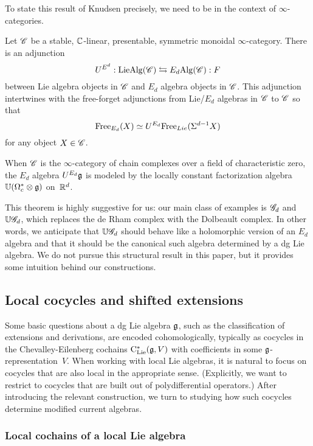 To state this result of Knudsen precisely, we need to be in the context of $\infty$-categories.

\begin{thm} 
\label{thm:knudsen}
Let $\mathscr C$ be a stable, $\mathbb C$-linear, presentable, symmetric monoidal $\infty$-category.
There is an adjunction
\[
U^{E^d} : {\rm LieAlg}(\mathscr C) \leftrightarrows E_d{\rm Alg} (\mathscr C): F
\]
between Lie algebra objects in $\mathscr C$ and $E_d$ algebra objects in $\mathscr C$.
This adjunction intertwines with the free-forget adjunctions from Lie/$E_d$ algebras in $\mathscr C$ to $\mathscr C$ 
so that 
\[
{\rm Free}_{E_d}(X) \simeq U^{E_d} {\rm Free}_{Lie}(\Sigma^{d-1} X)
\]
for any object $X \in \mathscr C$. 

When $\mathscr C$ is the $\infty$-category of chain complexes over a field of characteristic zero,
the $E_d$ algebra $U^{E_d} \mathfrak g$ is modeled by the locally constant factorization algebra $\mathbb U(\Omega^*_c \otimes \mathfrak g)$ on~$\mathbb R^d$.
\end{thm}

This theorem is highly suggestive for us:
our main class of examples is $\mathscr G_d$ and $\mathbb U \mathscr G_d$,
which replaces the de Rham complex with the Dolbeault complex.
In other words, we anticipate that $\mathbb U \mathscr G_d$ should behave like a holomorphic version of an $E_d$ algebra
and that it should be the canonical such algebra determined by a dg Lie algebra.
We do not pursue this structural result in this paper,
but it provides some intuition behind our constructions.

\subsection{Local cocycles and shifted extensions}
\label{sec: localcocycle}

Some basic questions about a dg Lie algebra $\mathfrak g$, such as the classification of extensions and derivations, are encoded cohomologically, typically as cocycles in the Chevalley-Eilenberg cochains ${\rm C}_{\rm Lie}^*(\mathfrak g,V)$ with coefficients in some $\mathfrak g$-representation~$V$.
When working with local Lie algebras, it is natural to focus on cocycles that are also local in the appropriate sense.
(Explicitly, we want to restrict to cocycles that are built out of polydifferential operators.)
After introducing the relevant construction, we turn to studying how such cocycles determine modified current algebras.

\subsubsection{Local cochains of a local Lie algebra}

